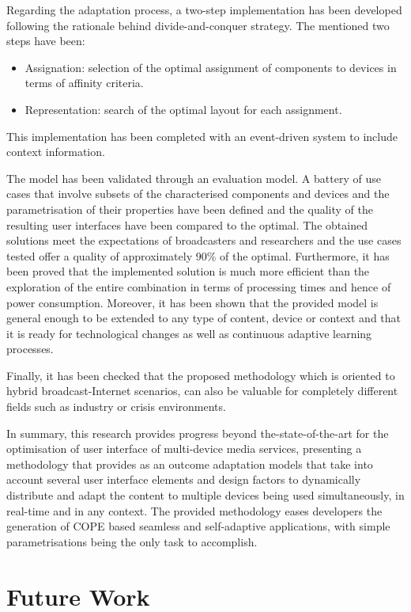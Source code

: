Regarding the adaptation process, a two-step implementation has been developed following the rationale behind divide-and-conquer strategy. The mentioned two steps have been:
\begin{itemize}
	\item Assignation: selection of the optimal assignment of components to devices in terms of affinity criteria.
	\item Representation: search of the optimal layout for each assignment. 
\end{itemize}

This implementation has been completed with an event-driven system to include context information. 

The model has been validated through an evaluation model. A battery of use cases that involve subsets of the characterised components and devices and the parametrisation of their properties have been defined and the quality of the resulting user interfaces have been compared to the optimal. The obtained solutions meet the expectations of broadcasters and researchers and the use cases tested offer a quality of approximately 90\% of the optimal. Furthermore, it has been proved that the implemented solution is much more efficient than the exploration of the entire combination in terms of processing times and hence of power consumption. Moreover, it has been shown that the provided model is general enough to be extended to any type of content, device or context and that it is ready for technological changes as well as continuous adaptive learning processes. 

Finally, it has been checked that the proposed methodology which is oriented to hybrid broadcast-Internet scenarios, can also be valuable for completely different fields such as industry or crisis environments. 

In summary, this research provides progress beyond the-state-of-the-art for the optimisation of user interface of multi-device media services, presenting a methodology that provides as an outcome adaptation models that take into account several user interface elements and design factors to dynamically distribute and adapt the content to multiple devices being used simultaneously, in real-time and in any context. The provided methodology eases developers the generation of COPE based seamless and self-adaptive applications, with simple parametrisations being the only task to accomplish. 

\section{Future Work}

